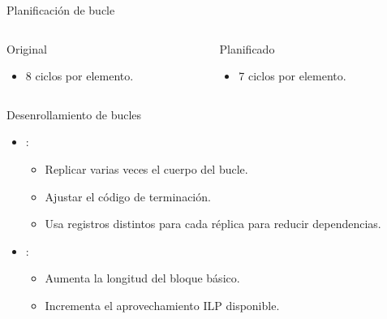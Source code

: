 \begin{frame}[t]{Planificación de bucle}

\begin{columns}[T]

\begin{column}{.45\textwidth}
\begin{block}{Original}

\end{block}

\begin{itemize}
  \item 8 ciclos por elemento.
\end{itemize}
\end{column}

\pause
\begin{column}{.45\textwidth}
\begin{block}{Planificado}

\end{block}
\begin{itemize}
  \item 7 ciclos por elemento.
\end{itemize}
\end{column}

\end{columns}
\end{frame}

\begin{frame}[t]{Desenrollamiento de bucles}
\begin{itemize}
  \item {}:
    \begin{itemize}
      \item Replicar varias veces el cuerpo del bucle.
      \item Ajustar el código de terminación.
      \item Usa registros distintos para cada réplica para reducir dependencias.
    \end{itemize}

  \item {}:
    \begin{itemize}
      \item Aumenta la longitud del bloque básico.
      \item Incrementa el aprovechamiento ILP disponible.
    \end{itemize}
\end{itemize}
\end{frame}


